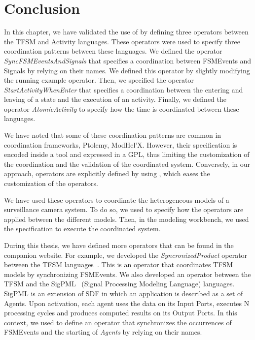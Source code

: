 \section{Conclusion}
In this chapter, we have validated the use of \bcool by defining three operators between the TFSM and Activity languages. These operators were used to specify three coordination patterns between these languages. We defined the operator \emph{SyncFSMEventsAndSignals} that specifies a coordination between FSMEvents and Signals by relying on their names. We defined this operator by slightly modifying the running example operator. Then, we specified the operator \emph{StartActivityWhenEnter} that specifies a coordination between the entering and leaving of a state and the execution of an activity. Finally, we defined the operator \emph{AtomicActivity} to specify how the time is coordinated between these languages.
	
We have noted that some of these coordination patterns are common in coordination frameworks, \eg Ptolemy, ModHel'X. However, their specification is encoded inside a tool and expressed in a GPL, thus limiting the customization of the coordination and the validation of the coordinated system. Conversely, in our approach, operators are explicitly defined by using \bcool, which eases the customization of the operators.
	
We have used these operators to coordinate the heterogeneous models of a surveillance camera system. To do so, we used \bflow to specify how the operators are applied between the different models. Then, in the modeling workbench, we used the \bflow specification to execute the coordinated system.  
	
	
During this thesis, we have defined more operators that can be found in the companion website. For example, we developed the \emph{SyncronizedProduct} operator between the TFSM languages~\cite{bcoolmodels15}. This is an operator that coordinates TFSM models by synchronizing FSMEvents. We also developed an operator between the TFSM and the SigPML~\cite{moccmlbib} (Signal Processing Modeling Language) languages. SigPML is an extension of SDF in which an application is described as a set of Agents. Upon activation, each agent uses the data on its Input Ports, executes N processing cycles and produces computed results on its Output Ports. In this context, we used \bcool to define an operator that synchronizes the occurrences of FSMEvents and the starting of \emph{Agents} by relying on their names. 


